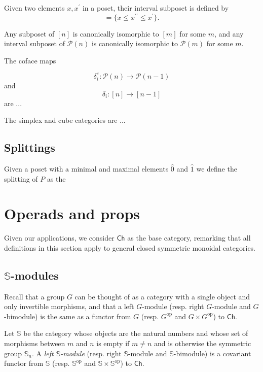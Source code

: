 \documentclass{amsart}
\renewcommand{\P}{\mathcal{P}}
\renewcommand{\S}{\mathbb{S}}
\newcommand{\minel}{\hat{0}}
\newcommand{\maxel}{\hat{1}}
\newcommand{\Ch}{\mathsf{Ch}}
\newcommand{\op}{\mathrm{op}}
\begin{document}
Given two elements $x, x^\prime$ in a poset, their interval subposet is defined by
\begin{equation*}
[x, x^\prime] = \{x \leq x^{\prime\prime} \leq x^\prime\}.
\end{equation*}

Any subposet of $[n]$ is canonically isomorphic to $[m]$ for some $m$, and any interval subposet of $\P(n)$ is canonically isomorphic to $\P(m)$ for some $m$.

The coface maps

\begin{equation*}
\delta_i^\varepsilon \colon \P(n) \to \P(n-1)
\end{equation*}
and
\begin{equation*}
\delta_i \colon [n] \to [n-1]
\end{equation*}
are ...

The simplex and cube categories are ...

\subsection{Splittings}
Given a poset with a minimal and maximal elements $\minel$ and $\maxel$ we define the splitting of $P$ as the 

\section{Operads and props}

Given our applications, we consider $\Ch$ as the base category, remarking that all definitions in this section apply to general closed symmetric monoidal categories.

\subsection{$\S$-modules}
Recall that a group $G$ can be thought of as a category with a single object and only invertible morphisms, and that a left $G$-module (resp. right $G$-module and $G$-bimodule) is the same as a functor from $G$ (resp. $G^\op$ and $G \times G^\op$) to $\Ch$.

Let $\S$ be the category whose objects are the natural numbers and whose set of morphisms between $m$ and $n$ is empty if $m \neq n$ and is otherwise the symmetric group $\S_n$.
A \textit{left $\S$-module} (resp. right $\S$-module and $\S$-bimodule) is a covariant functor from $\S$ (resp. $\S^\op$ and $\S \times \S^\op$) to $\Ch$.
\end{document}
